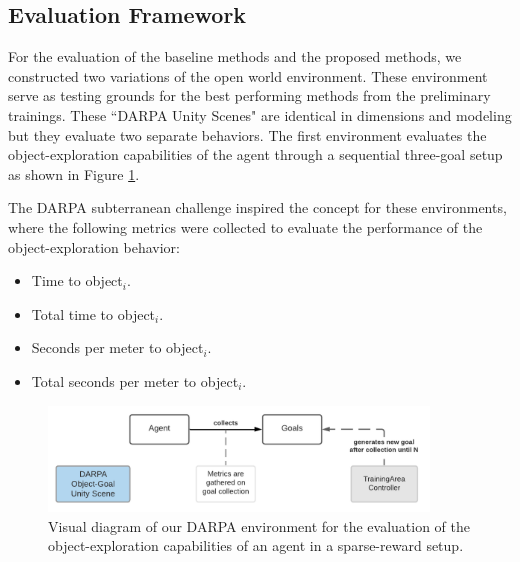 \subsection{Evaluation Framework}\label{chap:3:further-use:evaluation-framework}
For the evaluation of the baseline methods and the proposed methods, we constructed two variations of the open world environment. These environment serve as testing grounds for the best performing methods from the preliminary trainings. These “DARPA Unity Scenes" are identical in dimensions and modeling but they evaluate two separate behaviors. The first environment evaluates the object-exploration capabilities of the agent through a sequential three-goal setup as shown in Figure \ref{fig:darpa-object-setup}. 

The DARPA subterranean challenge \cite{darpa_subterranean_challenge} inspired the concept for these environments, where the following metrics were collected to evaluate the performance of the object-exploration behavior:
\begin{multicols}{2}
    \begin{itemize}
        \item Time to object$_i$.
        \item Total time to object$_i$.
        \item Seconds per meter to object$_i$.
        \item Total seconds per meter to object$_i$.
    \end{itemize}
\end{multicols}

\begin{figure}[!ht]
        \centering
        \includegraphics[width=0.9\textwidth]{images/darpa-object-setup_3.png} 
        \caption{Visual diagram of our DARPA environment for the evaluation of the object-exploration capabilities of an agent in a sparse-reward setup.}
        \label{fig:darpa-object-setup}
\end{figure}

